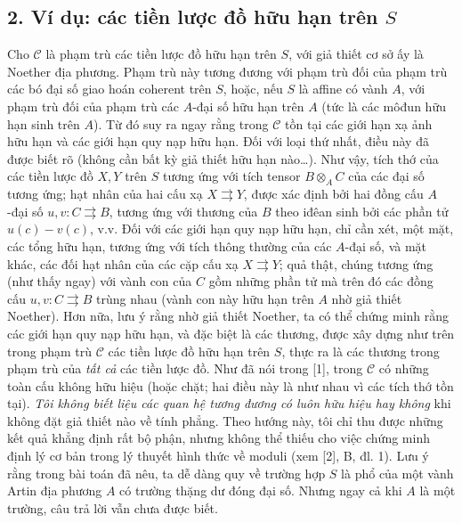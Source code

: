 \subsection*{2. Ví dụ: các tiền lược đồ hữu hạn trên $S$}

Cho $\mathcal C$ là phạm trù các tiền lược đồ hữu hạn trên $S$, với giả thiết
cơ sở ấy là Noether địa phương. Phạm trù này tương đương với phạm trù đối của phạm
trù các bó đại số giao hoán coherent trên $S$, hoặc, nếu $S$ là affine có
vành $A$, với phạm trù đối của phạm trù các $A$-đại số hữu hạn trên $A$ (tức
là các môđun hữu hạn sinh trên $A$). Từ đó suy ra ngay rằng trong $\mathcal C$
tồn tại các giới hạn xạ ảnh hữu hạn và các giới hạn quy nạp hữu hạn. Đối với
loại thứ nhất, điều này đã được biết rõ (không cần bất kỳ giả thiết hữu hạn
nào\ldots). Như vậy, tích thớ của các tiền lược đồ $X,Y$ trên $S$ tương ứng
với tích tensor $B\otimes_A C$ của các đại số tương ứng; hạt nhân của hai cấu
xạ $X\rightrightarrows Y$, được xác định bởi hai đồng cấu $A$-đại số
$u,v:C\rightrightarrows B$, tương ứng với thương của $B$ theo iđêan sinh bởi
các phần tử $u(c)-v(c)$, v.v. Đối với các giới hạn quy nạp hữu hạn, chỉ cần
xét, một mặt, các tổng hữu hạn, tương ứng với tích thông thường của các
$A$-đại số, và mặt khác, các đối hạt nhân của các cặp cấu xạ
$X\rightrightarrows Y$; quả thật, chúng tương ứng (như thấy ngay) với vành con
của $C$ gồm những phần tử mà trên đó các đồng cấu
$u,v:C\rightrightarrows B$ trùng nhau (vành con này hữu hạn trên $A$ nhờ giả
thiết Noether). Hơn nữa, lưu ý rằng nhờ giả thiết Noether, ta có thể chứng
minh rằng các giới hạn quy nạp hữu hạn, và đặc biệt là các thương, được xây
dựng như trên trong phạm trù $\mathcal C$ các tiền lược đồ hữu hạn trên $S$,
thực ra là các thương trong phạm trù của \emph{tất cả} các tiền lược đồ.
Như đã nói trong [1], trong $\mathcal C$ có những toàn cấu không hữu hiệu
(hoặc chặt; hai điều này là như nhau vì
các tích thớ tồn tại). \emph{Tôi không biết liệu các quan hệ tương đương có
luôn hữu hiệu hay không} khi không đặt giả thiết nào về tính phẳng. Theo hướng
này, tôi chỉ thu được những kết quả khẳng định rất bộ phận, nhưng không thể
thiếu cho việc chứng minh định lý cơ bản trong lý thuyết hình thức về moduli
(xem [2], B, đl. 1). Lưu ý rằng trong bài toán đã nêu, ta dễ dàng quy về
trường hợp $S$ là phổ của một vành Artin địa phương $A$ có trường thặng dư
đóng đại số. Nhưng ngay cả khi $A$ là một trường, câu trả lời vẫn chưa được
biết.

